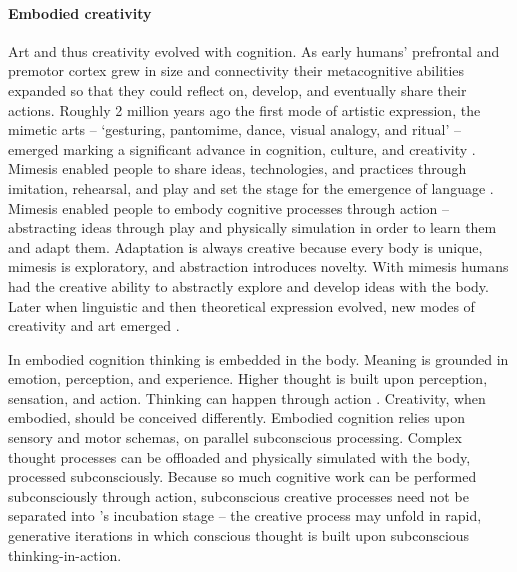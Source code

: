 \documentclass{article}
\begin{document}
\paragraph{Embodied creativity}
Art and thus creativity evolved with cognition.
As early humans' prefrontal and premotor cortex grew in size and connectivity 
their metacognitive abilities expanded 
so that they could reflect on, develop, and eventually share their actions.
%
Roughly 2 million years ago the first mode of artistic expression, the mimetic arts
 -- `gesturing, pantomime, dance, visual analogy, and ritual' -- emerged
marking a significant advance in cognition, culture, and creativity \citep{Donald2006}. 
Mimesis enabled people to share ideas, technologies, and practices through imitation, rehearsal, and play and set the stage for the emergence of language \citep{Donald2006}. 
%
Mimesis enabled people to embody cognitive processes through action -- 
abstracting ideas through play \citep{Deacon2006} and physically simulation \citep{Kirsh2013}
in order to learn them and adapt them. 
Adaptation is always creative because 
every body is unique,
mimesis is exploratory,
and abstraction introduces novelty. 
%
With mimesis humans had the creative ability to abstractly explore and develop ideas with the body. 
Later when linguistic and then theoretical expression evolved, new modes of creativity and art emerged \citep{Donald2006}. 

In embodied cognition thinking is embedded in the body. Meaning is grounded in emotion, perception, and experience.
Higher thought is built upon perception, sensation, and action. Thinking can happen through action \citep{Hardy-Vallee2008}. 
Creativity, when embodied, should be conceived differently. 
Embodied cognition relies upon sensory and motor schemas, on parallel subconscious processing. 
Complex thought processes can be offloaded and physically simulated with the body, processed subconsciously. 
Because so much cognitive work can be performed subconsciously through action, 
subconscious creative processes need not be separated into \citeauthor{Wallas1926}'s incubation stage -- 
the creative process may unfold in rapid, generative iterations in which conscious thought is built upon subconscious thinking-in-action.
\end{document}
